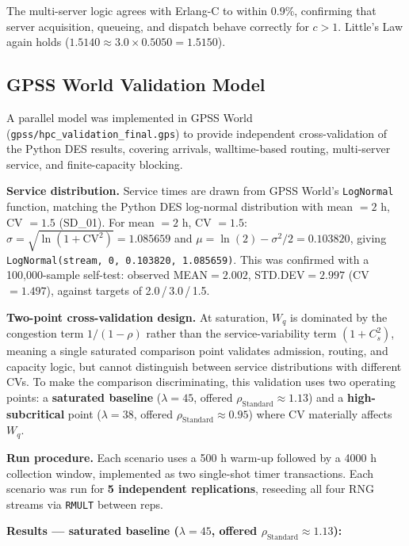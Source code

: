 \documentclass[11pt,a4paper]{article}
\newcommand{\Wq}{\ensuremath{W_q}}
\newcommand{\lam}{\ensuremath{\lambda}}
\newcommand{\murate}{\ensuremath{\mu}}
\begin{document}
The multi-server logic agrees with Erlang-C to within 0.9\%, confirming that server acquisition,
queueing, and dispatch behave correctly for $c > 1$. Little's Law again holds
($1.5140 \approx 3.0 \times 0.5050 = 1.5150$).

\subsection{GPSS World Validation Model}

A parallel model was implemented in GPSS World (\texttt{gpss/hpc\_validation\_final.gps}) to provide
independent cross-validation of the Python DES results, covering arrivals, walltime-based routing,
multi-server service, and finite-capacity blocking.

\textbf{Service distribution.} Service times are drawn from GPSS World's \texttt{LogNormal} function,
matching the Python DES log-normal distribution with mean $= 2$ h, CV $= 1.5$ (SD\_01).
For mean $= 2$ h, CV $= 1.5$: $\sigma = \sqrt{\ln(1+\text{CV}^2)} = 1.085659$ and
$\murate = \ln(2) - \sigma^2/2 = 0.103820$, giving
\texttt{LogNormal(stream, 0, 0.103820, 1.085659)}.
This was confirmed with a 100,000-sample self-test: observed MEAN$= 2.002$, STD.DEV$= 2.997$
(CV$= 1.497$), against targets of 2.0\,/\,3.0\,/\,1.5.

\textbf{Two-point cross-validation design.} At saturation, $\Wq$ is dominated by the congestion term
$1/(1-\rho)$ rather than the service-variability term $(1+C_s^2)$, meaning a single saturated
comparison point validates admission, routing, and capacity logic, but cannot distinguish between service
distributions with different CVs. To make the comparison discriminating, this validation uses two
operating points: a \textbf{saturated baseline} ($\lam=45$, offered $\rho_\text{Standard} \approx 1.13$)
and a \textbf{high-subcritical} point ($\lam=38$, offered $\rho_\text{Standard} \approx 0.95$) where CV
materially affects $\Wq$.

\textbf{Run procedure.} Each scenario uses a 500 h warm-up followed by a 4000 h collection window,
implemented as two single-shot timer transactions. Each scenario was run for \textbf{5 independent
replications}, reseeding all four RNG streams via \texttt{RMULT} between reps.

\textbf{Results — saturated baseline ($\lam=45$, offered $\rho_\text{Standard} \approx 1.13$):}
\end{document}
